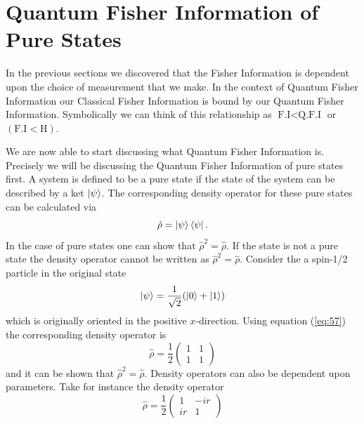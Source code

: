 \documentclass[twocolumn]{article}
\begin{document}
\section*{Quantum Fisher Information of Pure States}
In the previous sections we discovered that the Fisher Information is dependent upon the choice of measurement that we make. In the context of Quantum Fisher Information our Classical Fisher Information is bound by our Quantum Fisher Information. Symbolically we can think of this relationship as $\text{F.I}<\text{Q.F.I}$ or $(\text{F.I}<\text{H})$.

We are now able to start discussing what Quantum Fisher Information is. Precisely we will be discussing the Quantum Fisher Information of pure states first. A system is defined to be a pure state if the state of the system can be described by a ket $\ket{\psi}$. The corresponding density operator for these pure states can be calculated via
\begin{equation} \label{eq:57}
\hat{\rho}=\ket{\psi}\bra{\psi}.
\end{equation}
In the case of pure states one can show that $\hat{\rho}^2=\hat{\rho}$. If the state is not a pure state the density operator cannot be written as $\hat{\rho}^2=\hat{\rho}$. Consider the a spin-1/2 particle in the original state
\begin{equation} \label{eq:58}
\ket{\psi}=\frac{1}{\sqrt{2}}(\ket{0}+\ket{1})
\end{equation}
which is originally oriented in the positive $x$-direction. Using equation (\ref{eq:57}) the corresponding density operator is
\begin{equation} \label{eq:59}
\hat{\rho}=\frac{1}{2}
\begin{pmatrix}
1 & 1 \\
1 & 1
\end{pmatrix}
\end{equation}
and it can be shown that $\hat{\rho}^2=\hat{\rho}$. Density operators can also be dependent upon parameters. Take for instance the density operator
\begin{equation} \label{eq:60}
\hat{\rho}=\frac{1}{2}
\begin{pmatrix}
1 & -ir \\
ir & 1
\end{pmatrix}
\end{equation}
\end{document}
